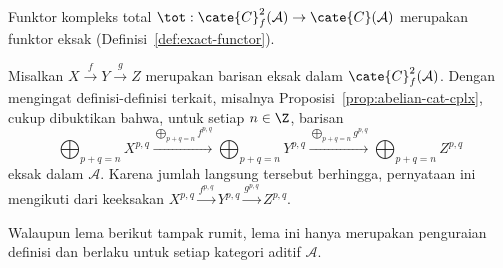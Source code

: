 \begin{lema}\label{prop:tot-exact}
	Funktor kompleks total
	$\tot: \cate{C}^2_f(\mathcal{A}) \to \cate{C}(\mathcal{A})$ merupakan
	funktor eksak (Definisi~\ref{def:exact-functor}).
\end{lema}
\begin{bukti}
	Misalkan $X \xrightarrow{f} Y \xrightarrow{g} Z$ merupakan barisan eksak dalam
	$\cate{C}^2_f(\mathcal{A})$. Dengan mengingat definisi-definisi terkait,
	misalnya Proposisi~\ref{prop:abelian-cat-cplx}, cukup dibuktikan bahwa,
	untuk setiap $n \in \Z$, barisan
	\[ \bigoplus_{p+q=n} X^{p,q} \xrightarrow{\bigoplus_{p+q=n} f^{p,q}} \bigoplus_{p+q=n} Y^{p,q} \xrightarrow{\bigoplus_{p+q=n} g^{p,q}} \bigoplus_{p+q=n} Z^{p,q} \]
	eksak dalam $\mathcal{A}$. Karena jumlah langsung tersebut berhingga,
	pernyataan ini mengikuti dari keeksakan
	$X^{p,q} \xrightarrow{f^{p,q}} Y^{p,q} \xrightarrow{g^{p,q}} Z^{p,q}$.
\end{bukti}

Walaupun lema berikut tampak rumit, lema ini hanya merupakan penguraian
definisi dan berlaku untuk setiap kategori aditif $\mathcal{A}$.

